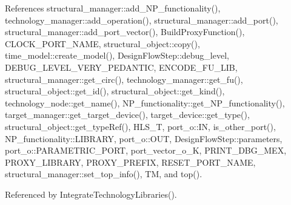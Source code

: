 References structural\+\_\+manager\+::add\+\_\+\+N\+P\+\_\+functionality(), technology\+\_\+manager\+::add\+\_\+operation(), structural\+\_\+manager\+::add\+\_\+port(), structural\+\_\+manager\+::add\+\_\+port\+\_\+vector(), Build\+Proxy\+Function(), C\+L\+O\+C\+K\+\_\+\+P\+O\+R\+T\+\_\+\+N\+A\+ME, structural\+\_\+object\+::copy(), time\+\_\+model\+::create\+\_\+model(), Design\+Flow\+Step\+::debug\+\_\+level, D\+E\+B\+U\+G\+\_\+\+L\+E\+V\+E\+L\+\_\+\+V\+E\+R\+Y\+\_\+\+P\+E\+D\+A\+N\+T\+IC, E\+N\+C\+O\+D\+E\+\_\+\+F\+U\+\_\+\+L\+IB, structural\+\_\+manager\+::get\+\_\+circ(), technology\+\_\+manager\+::get\+\_\+fu(), structural\+\_\+object\+::get\+\_\+id(), structural\+\_\+object\+::get\+\_\+kind(), technology\+\_\+node\+::get\+\_\+name(), N\+P\+\_\+functionality\+::get\+\_\+\+N\+P\+\_\+functionality(), target\+\_\+manager\+::get\+\_\+target\+\_\+device(), target\+\_\+device\+::get\+\_\+type(), structural\+\_\+object\+::get\+\_\+type\+Ref(), H\+L\+S\+\_\+T, port\+\_\+o\+::\+IN, is\+\_\+other\+\_\+port(), N\+P\+\_\+functionality\+::\+L\+I\+B\+R\+A\+RY, port\+\_\+o\+::\+O\+UT, Design\+Flow\+Step\+::parameters, port\+\_\+o\+::\+P\+A\+R\+A\+M\+E\+T\+R\+I\+C\+\_\+\+P\+O\+RT, port\+\_\+vector\+\_\+o\+\_\+K, P\+R\+I\+N\+T\+\_\+\+D\+B\+G\+\_\+\+M\+EX, P\+R\+O\+X\+Y\+\_\+\+L\+I\+B\+R\+A\+RY, P\+R\+O\+X\+Y\+\_\+\+P\+R\+E\+F\+IX, R\+E\+S\+E\+T\+\_\+\+P\+O\+R\+T\+\_\+\+N\+A\+ME, structural\+\_\+manager\+::set\+\_\+top\+\_\+info(), TM, and top().



Referenced by Integrate\+Technology\+Libraries().

